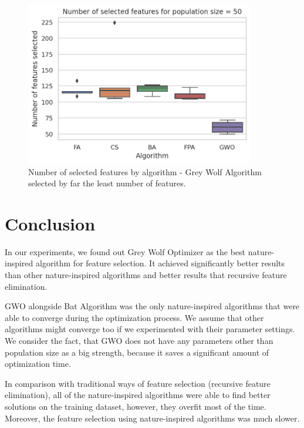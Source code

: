 \documentclass[runningheads]{llncs}
\begin{document}
\begin{figure}[ht]
	\begin{center}
	    \includegraphics[width=10cm]{figures/nia_selected_features_by_algorithm.png}
    \end{center}
	\caption{Number of selected features by algorithm - Grey Wolf Algorithm selected by far the least number of features.}
	\label{fig:nia_selected_features_by_algorithm}
\end{figure}

\section{Conclusion}

In our experiments, we found out Grey Wolf Optimizer as the best nature-inspired algorithm for feature selection. It achieved significantly better results than other nature-inspired algorithms and better results that recursive feature elimination.

GWO alongside Bat Algorithm was the only nature-inspired algorithms that were able to converge during the optimization process. We assume that other algorithms might converge too if we experimented with their parameter settings. We consider the fact, that GWO does not have any parameters other than population size as a big strength, because it saves a significant amount of optimization time.

In comparison with traditional ways of feature selection (recursive feature elimination), all of the nature-inspired algorithms were able to find better solutions on the training dataset, however, they overfit most of the time. Moreover, the feature selection using nature-inspired algorithms was much slower.




\end{document}
